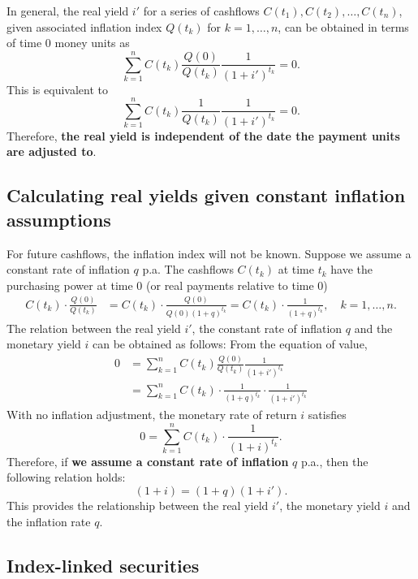 \documentclass[
]{book}
\theoremstyle{definition}
\theoremstyle{definition}
\theoremstyle{definition}
\theoremstyle{definition}
\theoremstyle{remark}
\begin{document}
In general, the real yield \(i'\) for a series of cashflows
\(C(t_1), C(t_2), \ldots, C(t_n)\), given associated inflation index
\(Q(t_k)\) for \(k = 1, \ldots, n\), can be obtained in terms of time 0
money units as
\[\sum_{k=1}^n C(t_k) \frac{Q(0)}{Q(t_k)} \frac{1}{(1 + i')^{t_k}} = 0.\]
This is equivalent to
\[\sum_{k=1}^n C(t_k) \frac{1}{Q(t_k)} \frac{1}{(1 + i')^{t_k}} = 0.\]
Therefore, \textbf{the real yield is independent of the date the payment units
are adjusted to}.

\hypertarget{calculating-real-yields-given-constant-inflation-assumptions}{%
\subsection{Calculating real yields given constant inflation assumptions}\label{calculating-real-yields-given-constant-inflation-assumptions}}

For future cashflows, the inflation index will not be known. Suppose we
assume a constant rate of inflation \(q\) p.a. The cashflows \(C(t_k)\) at
time \(t_k\) have the purchasing power at time 0 (or real payments
relative to time 0) \[\begin{aligned}
    C(t_k) \cdot \frac{Q(0)}{Q(t_k)} &=     C(t_k) \cdot \frac{Q(0)}{Q(0)(1+q)^{t_k}}  =  C(t_k) \cdot \frac{1}{(1+q)^{t_k}} , \quad k = 1, \ldots, n.\end{aligned}\]
The relation between the real yield \(i'\), the constant rate of inflation
\(q\) and the monetary yield \(i\) can be obtained as follows: From the
equation of value, \[\begin{aligned}
    0   &= \sum_{k=1}^n C(t_k) \frac{Q(0)}{Q(t_k)} \frac{1}{(1 + i')^{t_k}} \\
        &=  \sum_{k=1}^n C(t_k)  \cdot \frac{1}{(1+q)^{t_k}}\cdot \frac{1}{(1 + i')^{t_k}}\end{aligned}\]
With no inflation adjustment, the monetary rate of return \(i\) satisfies
\[0 =  \sum_{k=1}^n C(t_k)  \cdot \frac{1}{(1+i)^{t_k}}.\] Therefore, if
\textbf{we assume a constant rate of inflation} \(q\) p.a., then the following
relation holds: \[(1 +i) = ( 1 + q)(1+i').\] This provides the
relationship between the real yield \(i'\), the monetary yield \(i\) and the
inflation rate \(q\).

\hypertarget{index-linked-securities}{%
\subsection{Index-linked securities}\label{index-linked-securities}}
\end{document}
